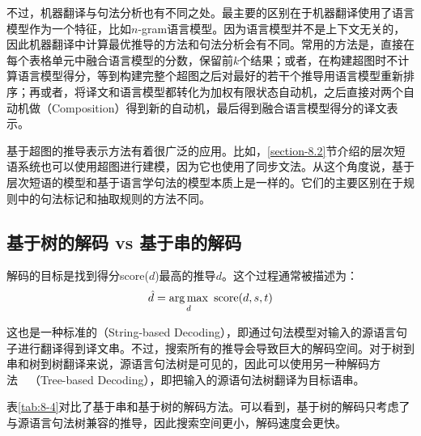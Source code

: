 \parinterval 不过，机器翻译与句法分析也有不同之处。最主要的区别在于机器翻译使用了语言模型作为一个特征，比如$n$-gram语言模型。因为语言模型并不是上下文无关的，因此机器翻译中计算最优推导的方法和句法分析会有不同。常用的方法是，直接在每个表格单元中融合语言模型的分数，保留前$k$个结果；或者，在构建超图时不计算语言模型得分，等到构建完整个超图之后对最好的若干个推导用语言模型重新排序；再或者，将译文和语言模型都转化为加权有限状态自动机，之后直接对两个自动机做{\small{}}（Composition）得到新的自动机，最后得到融合语言模型得分的译文表示。

\parinterval 基于超图的推导表示方法有着很广泛的应用。比如，\ref{section-8.2}节介绍的层次短语系统也可以使用超图进行建模，因为它也使用了同步文法。从这个角度说，基于层次短语的模型和基于语言学句法的模型本质上是一样的。它们的主要区别在于规则中的句法标记和抽取规则的方法不同。


\subsection{基于树的解码 vs 基于串的解码}

\parinterval 解码的目标是找到得分score($d$)最高的推导$d$。这个过程通常被描述为：
\begin{eqnarray}
\hat{d} = \operatorname*{arg\,max}_d\ \textrm{score} (d,{s},{t})
\label{eq:8-13}
\end{eqnarray}

\parinterval 这也是一种标准的{\small{}}（String-based Decoding），即通过句法模型对输入的源语言句子进行翻译得到译文串。不过，搜索所有的推导会导致巨大的解码空间。对于树到串和树到树翻译来说，源语言句法树是可见的，因此可以使用另一种解码方法\ \dash \ {\small{}}（Tree-based Decoding），即把输入的源语句法树翻译为目标语串。

\parinterval 表\ref{tab:8-4}对比了基于串和基于树的解码方法。可以看到，基于树的解码只考虑了与源语言句法树兼容的推导，因此搜索空间更小，解码速度会更快。

